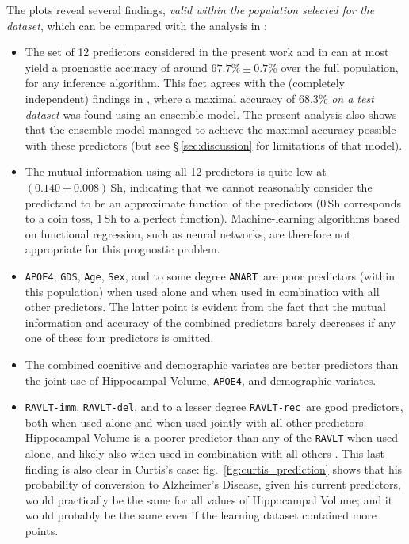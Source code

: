 \documentclass[utf8]{FrontiersinHarvard_mod} %
\newcommand*{\sect}{\S}%
\newcommand*{\fig}{fig.}%
\renewcommand*{\|}[1][]{\nonscript\:#1\vert\nonscript\:\mathopen{}}
\newcommand*{\age}{\texttt{Age}}
\newcommand*{\sex}{\texttt{Sex}}
\newcommand*{\apoe}{\texttt{APOE4}}
\newcommand*{\anart}{\texttt{ANART}}
\newcommand*{\gds}{\texttt{GDS}}
\newcommand*{\ravltimm}{\texttt{RAVLT-imm}}
\newcommand*{\ravltdel}{\texttt{RAVLT-del}}
\newcommand*{\ravltrec}{\texttt{RAVLT-rec}}
\newcommand*{\ad}{Alzheimer's Disease}
\begin{document}
The plots reveal several findings, \emph{valid within the population selected for the dataset}, which can be compared with the analysis in \citet[see especially Fig.~3 and Table~3]{ryeetal2022}:
\begin{itemize}
\item The set of 12 predictors considered in the present work and in \citet{ryeetal2022} can at most yield a prognostic accuracy of around $67.7\%\pm0.7\%$ over the full population, for any inference algorithm. This fact agrees with the (completely independent) findings in \citet{ryeetal2022}, where a maximal accuracy of 68.3\% \emph{on a test dataset} was found using an ensemble model. The present analysis also shows that the ensemble model managed to achieve the maximal accuracy possible with these predictors (but see \sect\,\ref{sec:discussion} for limitations of that model).

\item The mutual information using all 12 predictors is quite low at $(0.140\pm 0.008)\,\mathrm{Sh}$, indicating that we cannot reasonably consider the predictand to be an approximate function of the predictors ($0\,\mathrm{Sh}$ corresponds to a coin toss, $1\,\mathrm{Sh}$ to a perfect function). Machine-learning algorithms based on functional regression, such as neural networks, are therefore not appropriate for this prognostic problem.

\item \apoe, \gds, \age, \sex, and to some degree \anart\   are poor predictors (within this population) when used alone and when used in combination with all other predictors. The latter point is evident from the fact that the mutual information and accuracy of the combined predictors barely decreases if any one of these four predictors is omitted.

\item The combined cognitive and demographic variates are better predictors than the joint use of Hippocampal Volume, \apoe, and demographic variates.

\item \ravltimm, \ravltdel, and to a lesser degree \ravltrec\ are good predictors, both when used alone and when used jointly with all other predictors. Hippocampal Volume is a poorer predictor than any of the \texttt{RAVLT} when used alone, and likely also when used in combination with all others \citep[contrast this with][]{ryeetal2022}. 
This last finding is also clear in Curtis's case: \fig~\ref{fig:curtis_prediction} shows that his probability of conversion to \ad, given his current predictors, would practically be the same for all values of Hippocampal Volume; and it would probably be the same even if the learning dataset contained more points.
\end{itemize}
\end{document}
